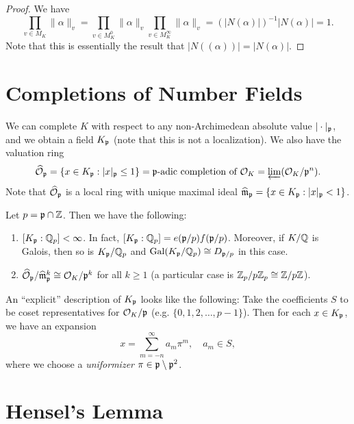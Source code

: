 \begin{proof}
  We have
  \[
    \prod_{v \in M_K} \|\alpha\|_v
    = \prod_{v \in M_K^0} \|\alpha\|_{v}
    \prod_{v \in M_K^\infty} \|\alpha\|_{v}
    = (|N(\alpha)|)^{-1} |N(\alpha)|
    = 1.
  \]
  Note that this is essentially the result
  that $|N((\alpha))| = |N(\alpha)|$.
\end{proof}

\section{Completions of Number Fields}

\begin{remark}
  We can complete $K$ with respect to any
  non-Archimedean absolute value $|\cdot|_{\mathfrak{p}}$,
  and we obtain a field $K_{\mathfrak{p}}$ (note that this is not
  a localization). We also have the
  valuation ring
  \[
    \widehat{\mathcal{O}}_{\mathfrak{p}} = \{x \in K_{\mathfrak{p}} : |x|_{\mathfrak{p}} \le 1\}
    = \text{$\mathfrak{p}$-adic completion of $\mathcal{O}_K$}
    = \varprojlim (\mathcal{O}_K / \mathfrak{p}^n).
  \]
  Note that $\widehat{\mathcal{O}}_{\mathfrak{p}}$ is a local ring
  with unique maximal ideal
  $\widehat{\mathfrak{m}}_{\mathfrak{p}} = \{x \in K_{\mathfrak{p}} : |x|_{\mathfrak{p}} < 1\}$.
\end{remark}

\begin{theorem}
  Let $p = \mathfrak{p} \cap \mathbb{Z}$. Then we have the following:
  \begin{enumerate}
    \item $[K_{\mathfrak{p}} : \mathbb{Q}_p] < \infty$. In fact,
      $[K_{\mathfrak{p}} : \mathbb{Q}_p] = e(\mathfrak{p} / p) f(\mathfrak{p} / p)$.
      Moreover, if $K / \mathbb{Q}$ is Galois, then so is
      $K_{\mathfrak{p}} / \mathbb{Q}_p$ and
      $\operatorname{Gal}(K_{\mathfrak{p}} / \mathbb{Q}_p) \cong D_{\mathfrak{p} / p}$ in this case.
    \item $\widehat{\mathcal{O}}_{\mathfrak{p}} / \widehat{\mathfrak{m}}_{\mathfrak{p}}^k \cong \mathcal{O}_K / \mathfrak{p}^k$ for all $k \ge 1$ (a particular case
      is $\mathbb{Z}_p / p \mathbb{Z}_p \cong \mathbb{Z} / p\mathbb{Z}$).
  \end{enumerate}
\end{theorem}

\begin{remark}
  An ``explicit'' description of $K_{\mathfrak{p}}$ looks like
  the following: Take the coefficients $S$ to be
  coset representatives for $\mathcal{O}_K / \mathfrak{p}$
  (e.g. $\{0, 1, 2, \dots, p - 1\}$). Then for
  each $x \in K_{\mathfrak{p}}$, we have an expansion
  \[
    x = \sum_{m = -n}^\infty a_m \pi^m, \quad a_m \in S,
  \]
  where we choose a \emph{uniformizer}
  $\pi \in \mathfrak{p} \setminus \mathfrak{p}^2$.
\end{remark}

\section{Hensel's Lemma}

